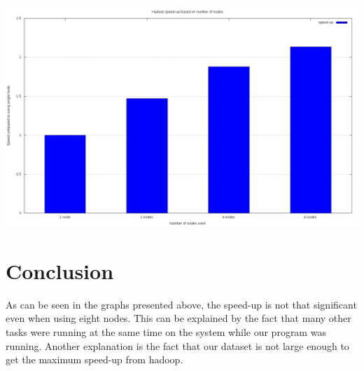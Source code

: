 \documentclass[a4paper,12px]{article}
\begin{document}
\begin{center}
    \includegraphics[width=\textwidth]{speedup}
\end{center}

\section{Conclusion}

As can be seen in the graphs presented above, the speed-up is not that
significant even when using eight nodes. This can be explained by the fact that
many other tasks were running at the same time on the system while our program
was running. Another explanation is the fact that our dataset is not large
enough to get the maximum speed-up from hadoop.



%
%
\end{document}
